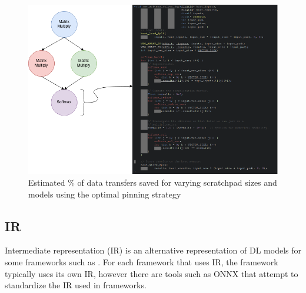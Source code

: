 \begin{figure}[th]
\centering
\includegraphics[scale=0.5]{Figures/operator_to_kernel.png}
\decoRule
\caption[operatorKernel]{Estimated \% of data transfers saved for varying scratchpad sizes and models using the optimal pinning strategy}
\label{fig:OperatorKernel}
\end{figure}


\subsection{IR}
Intermediate representation (IR) is an alternative representation of DL models
for some frameworks such as \cite{DLVM} \cite{nGraph} \cite{ONNX}. For each
framework that uses IR, the framework typically uses its own IR, however
there are tools such as ONNX that attempt to standardize the IR used in
frameworks. 

